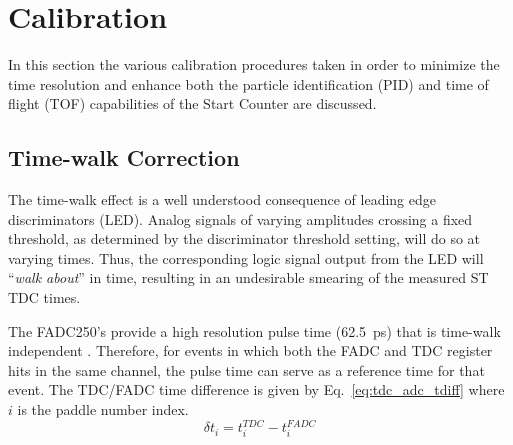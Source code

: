 \section{Calibration} \label{sec:calib}

In this section the various calibration procedures taken in order to minimize the time resolution and enhance both the particle identification (PID) and time of flight (TOF) capabilities of the Start Counter are discussed.

\subsection{Time-walk Correction} \label{sec:calib_tw}

The time-walk effect is a well understood consequence of leading edge discriminators (LED).  Analog signals of varying amplitudes crossing a fixed threshold, as determined by the discriminator threshold setting, will do so at varying times. %
Thus, the corresponding logic signal output from the LED will ``\textit{walk about}'' in time, resulting in an undesirable smearing of the measured ST TDC times.

The FADC250's provide a high resolution pulse time (62.5~ps) that is time-walk independent \cite{pooser16} \cite{dong_fadc}.  
Therefore, for events in which both the FADC and TDC register hits in the same channel, the pulse time can serve as a reference time for that event.  The TDC/FADC time difference is given by Eq.~\ref{eq:tdc_adc_tdiff} where $i$ is the paddle number index.
	\begin{equation} \label{eq:tdc_adc_tdiff}
		\delta t_{i} = t^{TDC}_{i} - t^{FADC}_{i}
	\end{equation}
	
